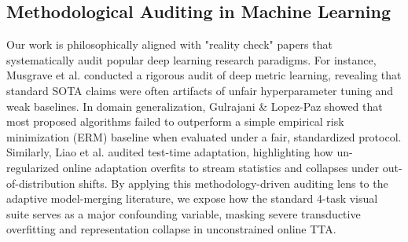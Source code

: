 \subsection{Methodological Auditing in Machine Learning}
Our work is philosophically aligned with "reality check" papers that systematically audit popular deep learning research paradigms.
For instance, Musgrave et al. \cite{musgrave2020metric} conducted a rigorous audit of deep metric learning, revealing that standard SOTA claims were often artifacts of unfair hyperparameter tuning and weak baselines.
In domain generalization, Gulrajani \& Lopez-Paz \cite{gulrajani2020in} showed that most proposed algorithms failed to outperform a simple empirical risk minimization (ERM) baseline when evaluated under a fair, standardized protocol.
Similarly, Liao et al. \cite{liao2021are} audited test-time adaptation, highlighting how un-regularized online adaptation overfits to stream statistics and collapses under out-of-distribution shifts.
By applying this methodology-driven auditing lens to the adaptive model-merging literature, we expose how the standard 4-task visual suite serves as a major confounding variable, masking severe transductive overfitting and representation collapse in unconstrained online TTA.
